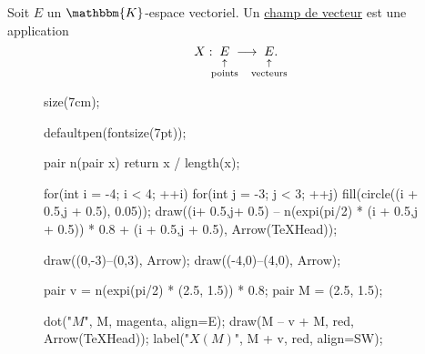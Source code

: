 \begin{exm}
	Soit $E$ un $\mathbbm{K}$-espace vectoriel. Un \underline{champ de vecteur} est une application  \[
		X :\;\underset{\mathclap{\substack{~\\\uparrow\\[0.5mm]\text{points}}}}{E}\; \longrightarrow\;\underset{\mathclap{\substack{~\\\uparrow\\[0.5mm]\text{vecteurs}}}}{E}.
	\]

	\begin{figure}[H]
		\centering
		\begin{asy}
			size(7cm);

			defaultpen(fontsize(7pt));

			pair n(pair x) { return x / length(x); }

			for(int i = -4; i < 4; ++i)
				for(int j = -3; j < 3; ++j) {
					fill(circle((i + 0.5,j + 0.5), 0.05));
					draw((i+ 0.5,j+ 0.5) -- n(expi(pi/2) * (i + 0.5,j + 0.5)) * 0.8 + (i + 0.5,j + 0.5), Arrow(TeXHead));
				}

			draw((0,-3)--(0,3), Arrow);
			draw((-4,0)--(4,0), Arrow);

			pair v = n(expi(pi/2) * (2.5, 1.5)) * 0.8;
			pair M = (2.5, 1.5);

			dot("$M$", M, magenta, align=E);
			draw(M -- v + M, red, Arrow(TeXHead));
			label("$X(M)$", M + v, red, align=SW);
		\end{asy}
	\end{figure}
\end{exm}

